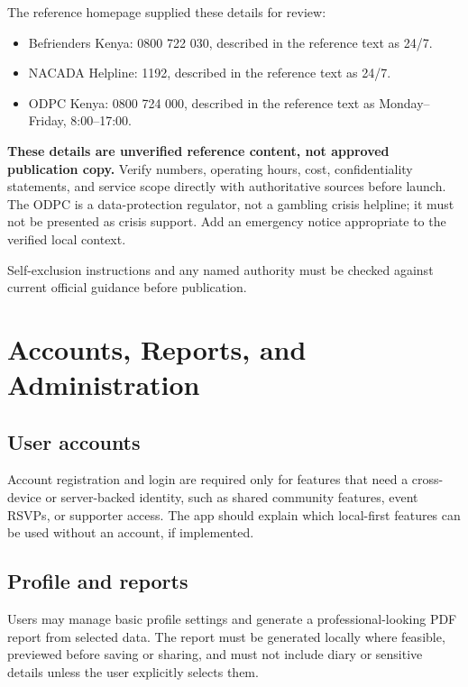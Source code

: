 \documentclass[11pt,a4paper]{article}
\begin{document}
The reference homepage supplied these details for review:
\begin{itemize}
  \item Befrienders Kenya: 0800 722 030, described in the reference text as 24/7.
  \item NACADA Helpline: 1192, described in the reference text as 24/7.
  \item ODPC Kenya: 0800 724 000, described in the reference text as Monday--Friday, 8:00--17:00.
\end{itemize}
\textbf{These details are unverified reference content, not approved publication copy.} Verify numbers, operating hours, cost, confidentiality statements, and service scope directly with authoritative sources before launch. The ODPC is a data-protection regulator, not a gambling crisis helpline; it must not be presented as crisis support. Add an emergency notice appropriate to the verified local context.

Self-exclusion instructions and any named authority must be checked against current official guidance before publication.

\section{Accounts, Reports, and Administration}

\subsection{User accounts}
Account registration and login are required only for features that need a cross-device or server-backed identity, such as shared community features, event RSVPs, or supporter access. The app should explain which local-first features can be used without an account, if implemented.

\subsection{Profile and reports}
Users may manage basic profile settings and generate a professional-looking PDF report from selected data. The report must be generated locally where feasible, previewed before saving or sharing, and must not include diary or sensitive details unless the user explicitly selects them.
\end{document}
